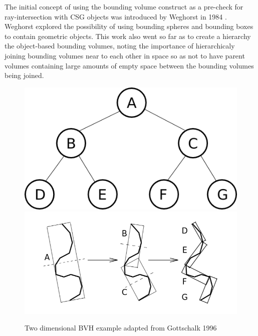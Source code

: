 \documentclass[12pt, a4paper]{article}
\begin{document}
The initial concept of using the bounding volume construct as a pre-check for ray-intersection with CSG objects was introduced by Weghorst in 1984 \cite{Weghorst_1984}. Weghorst explored the possibility of using bounding spheres and bounding boxes to contain geometric objects. This work also went so far as to create a hierarchy the object-based bounding volumes, noting the importance of hierarchicaly joining bounding volumes near to each other in space so as not to have parent volumes containing large amounts of empty space between the bounding volumes being joined.

\begin{figure}[H]
  \centering
  \includegraphics[scale=0.3]{binary_graph.png}
  \includegraphics[scale=0.3, trim = 0 50 0 0 ]{bvh_2d_ex.png}
  \caption{Two dimensional BVH example adapted from Gottschalk 1996 \cite{Gottschalk_1996}}
  \label{2dbvh}
\end{figure}

\end{document}
